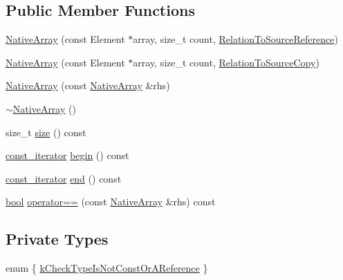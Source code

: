 \subsection*{Public Member Functions}
\begin{DoxyCompactItemize}
\item 
\hyperlink{classtesting_1_1internal_1_1NativeArray_a52b3689c62532703d11e9d82939a7141}{Native\+Array} (const Element $\ast$array, size\+\_\+t count, \hyperlink{structtesting_1_1internal_1_1RelationToSourceReference}{Relation\+To\+Source\+Reference})
\item 
\hyperlink{classtesting_1_1internal_1_1NativeArray_ac184ee5741af5be3402213819c834405}{Native\+Array} (const Element $\ast$array, size\+\_\+t count, \hyperlink{structtesting_1_1internal_1_1RelationToSourceCopy}{Relation\+To\+Source\+Copy})
\item 
\hyperlink{classtesting_1_1internal_1_1NativeArray_abb346ac3040f5da733f594cc2d5958bc}{Native\+Array} (const \hyperlink{classtesting_1_1internal_1_1NativeArray}{Native\+Array} \&rhs)
\item 
\hyperlink{classtesting_1_1internal_1_1NativeArray_a55ab5948d473a487303dcf6e02ad1f60}{$\sim$\+Native\+Array} ()
\item 
size\+\_\+t \hyperlink{classtesting_1_1internal_1_1NativeArray_af96a4a5ca0cdd5d163c47a081f08bd89}{size} () const
\item 
\hyperlink{classtesting_1_1internal_1_1NativeArray_a9ce7c8408460d7158a2870456d134557}{const\+\_\+iterator} \hyperlink{classtesting_1_1internal_1_1NativeArray_a3046d93cfa23097e7b7c91f5f982dc78}{begin} () const
\item 
\hyperlink{classtesting_1_1internal_1_1NativeArray_a9ce7c8408460d7158a2870456d134557}{const\+\_\+iterator} \hyperlink{classtesting_1_1internal_1_1NativeArray_ae1cda748e49c6906421c6183c4d07c5a}{end} () const
\item 
\hyperlink{classbool}{bool} \hyperlink{classtesting_1_1internal_1_1NativeArray_a81b90f5739ed812610e68dc34c9e3850}{operator==} (const \hyperlink{classtesting_1_1internal_1_1NativeArray}{Native\+Array} \&rhs) const
\end{DoxyCompactItemize}
\subsection*{Private Types}
\begin{DoxyCompactItemize}
\item 
enum \{ \hyperlink{classtesting_1_1internal_1_1NativeArray_a14c66e9a884d371ac83e4fb9eb55148ea3be52e24b6c1558a819baf99922f9296}{k\+Check\+Type\+Is\+Not\+Const\+Or\+A\+Reference}
 \}
\end{DoxyCompactItemize}
